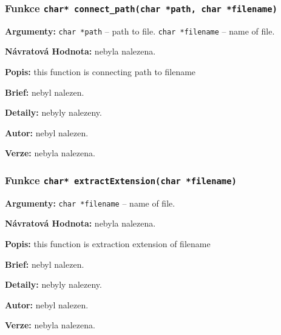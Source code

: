 \documentclass[12pt, a4paper]{article}
\begin{document}
\subsubsection{Funkce \texttt{char* connect\_path(char *path, char *filename)}}
\textbf{Argumenty: }\verb"char *path" -- path to file. \verb"char *filename" -- name of file. \\
\par\noindent
\textbf{Návratová Hodnota: }nebyla nalezena.\\
\par\noindent
\textbf{Popis: }this function is connecting path to filename\\
\par\noindent
\textbf{Brief: }nebyl nalezen.\\
\par\noindent
\textbf{Detaily: }nebyly nalezeny.\\
\par\noindent
\textbf{Autor: }nebyl nalezen.\\
\par\noindent
\textbf{Verze: }nebyla nalezena.\\
\par\noindent
\subsubsection{Funkce \texttt{char* extractExtension(char *filename)}}
\textbf{Argumenty: }\verb"char *filename" -- name of file. \\
\par\noindent
\textbf{Návratová Hodnota: }nebyla nalezena.\\
\par\noindent
\textbf{Popis: }this function is extraction extension of filename\\
\par\noindent
\textbf{Brief: }nebyl nalezen.\\
\par\noindent
\textbf{Detaily: }nebyly nalezeny.\\
\par\noindent
\textbf{Autor: }nebyl nalezen.\\
\par\noindent
\textbf{Verze: }nebyla nalezena.\\
\par\noindent
\end{document}
